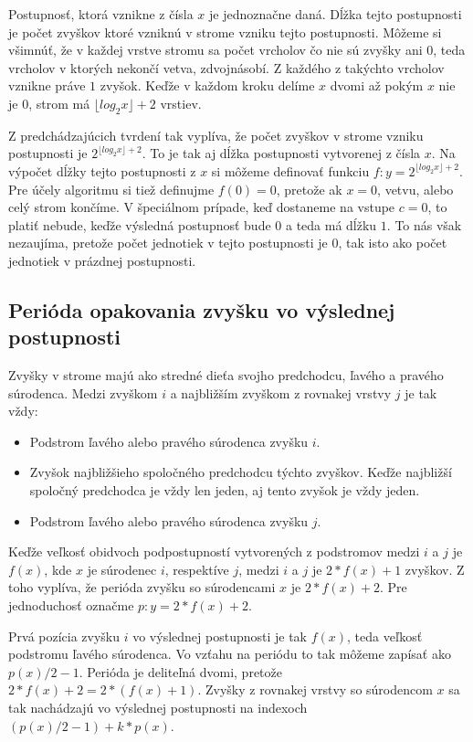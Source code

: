 \documentclass[10pt]{article}
\begin{document}
Postupnosť, ktorá vznikne z čísla $x$ je jednoznačne daná. Dĺžka tejto
postupnosti je počet zvyškov ktoré vzniknú v strome vzniku tejto postupnosti.
Môžeme si všimnúť, že v každej vrstve stromu sa počet vrcholov čo nie sú zvyšky
ani $0$, teda vrcholov v ktorých nekončí vetva, zdvojnásobí. Z každého z
takýchto vrcholov vznikne práve $1$ zvyšok. Keďže v každom kroku delíme $x$
dvomi až pokým $x$ nie je $0$, strom má $\lfloor log_2 x \rfloor + 2$ vrstiev.

Z predchádzajúcich tvrdení tak vyplíva, že počet zvyškov v strome vzniku
postupnosti je $2^{\lfloor log_2 x \rfloor + 2}$. To je tak aj dĺžka
postupnosti vytvorenej z čísla $x$. Na výpočet dĺžky tejto postupnosti z $x$ si 
môžeme definovať funkciu $f: y = 2^{\lfloor log_2 x \rfloor + 2}$. Pre účely
algoritmu si tiež definujme $f(0) = 0$, pretože ak $x=0$, vetvu, alebo celý
strom končíme. V špeciálnom prípade, keď dostaneme na vstupe $c=0$, to platiť
nebude, keďže výsledná postupnosť bude $0$ a teda má dĺžku $1$. To nás však
nezaujíma, pretože počet jednotiek v tejto postupnosti je $0$, tak isto ako
počet jednotiek v prázdnej postupnosti.

\subsection*{Perióda opakovania zvyšku vo výslednej postupnosti}

Zvyšky v strome majú ako stredné dieťa svojho predchodcu, ľavého a pravého
súrodenca. Medzi zvyškom $i$ a najbližším zvyškom z rovnakej vrstvy $j$ je tak
vždy:

\begin{itemize}
  \item Podstrom ľavého alebo pravého súrodenca zvyšku $i$.
  \item Zvyšok najbližšieho spoločného predchodcu týchto zvyškov. Keďže
  najbližší spoločný predchodca je vždy len jeden, aj tento zvyšok je vždy
  jeden. 
  \item Podstrom ľavého alebo pravého súrodenca zvyšku $j$.
\end{itemize}

Keďže veľkosť obidvoch podpostupností vytvorených z podstromov medzi $i$ a $j$
je $f(x)$, kde $x$ je súrodenec $i$, respektíve $j$, medzi $i$ a $j$ je
$2*f(x)+1$ zvyškov. Z toho vyplíva, že perióda zvyšku so súrodencami $x$ je
$2*f(x)+2$. Pre jednoduchosť označme $p: y = 2*f(x)+2$.

Prvá pozícia zvyšku $i$ vo výslednej postupnosti je tak $f(x)$, teda veľkosť
podstromu ľavého súrodenca. Vo vzťahu na periódu to tak môžeme zapísať ako
$p(x)/2-1$. Perióda je deliteľná dvomi, pretože $2*f(x)+2 = 2*(f(x) + 1)$.
Zvyšky z rovnakej vrstvy so súrodencom $x$ sa tak nachádzajú vo výslednej
postupnosti na indexoch $(p(x)/2-1)+k*p(x)$.
\end{document}

